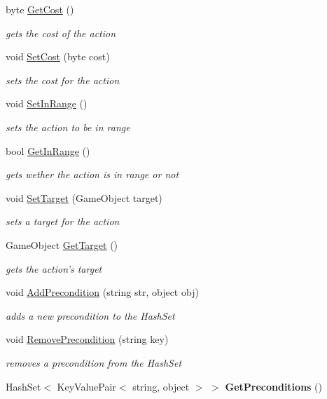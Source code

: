 \begin{DoxyCompactItemize}
\item 
byte \hyperlink{class_action_ac1cd1bb574e98e9e299e786727395b93}{Get\+Cost} ()
\begin{DoxyCompactList}\small\item\em gets the cost of the action \end{DoxyCompactList}\item 
void \hyperlink{class_action_ad95984cfd81dd0debd89b2eb62f66d5f}{Set\+Cost} (byte cost)
\begin{DoxyCompactList}\small\item\em sets the cost for the action \end{DoxyCompactList}\item 
void \hyperlink{class_action_a60832e6094bf58d56b86db14c0c86244}{Set\+In\+Range} ()
\begin{DoxyCompactList}\small\item\em sets the action to be in range \end{DoxyCompactList}\item 
bool \hyperlink{class_action_a2f1a8b4050f57bf34f6691c4403898bc}{Get\+In\+Range} ()
\begin{DoxyCompactList}\small\item\em gets wether the action is in range or not \end{DoxyCompactList}\item 
void \hyperlink{class_action_aca3de1e11c18edc715a3322bc01c1e91}{Set\+Target} (Game\+Object target)
\begin{DoxyCompactList}\small\item\em sets a target for the action \end{DoxyCompactList}\item 
Game\+Object \hyperlink{class_action_a1c21dae76e175d5921d012a56e34c8b7}{Get\+Target} ()
\begin{DoxyCompactList}\small\item\em gets the action's target \end{DoxyCompactList}\item 
void \hyperlink{class_action_acf226c4a5fac20e472678232b1677b44}{Add\+Precondition} (string str, object obj)
\begin{DoxyCompactList}\small\item\em adds a new precondition to the Hash\+Set \end{DoxyCompactList}\item 
void \hyperlink{class_action_aae731975d3759bbbd4a03ff12804fda5}{Remove\+Precondition} (string key)
\begin{DoxyCompactList}\small\item\em removes a precondition from the Hash\+Set \end{DoxyCompactList}\item 
\hypertarget{class_action_aa2843e05295e1cd9f321c4f32f70646e}{}Hash\+Set$<$ Key\+Value\+Pair$<$ string, object $>$ $>$ {\bfseries Get\+Preconditions} ()\label{class_action_aa2843e05295e1cd9f321c4f32f70646e}


\end{DoxyCompactItemize}

